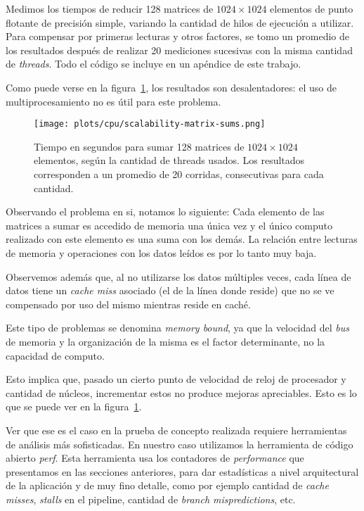 Medimos los tiempos de reducir 128 matrices de $1024 \times 1024$ elementos de punto
flotante de precisi\'on simple, variando la cantidad de hilos de ejecuci\'on a
utilizar. Para compensar por primeras lecturas y otros factores, se tomo un promedio
de los resultados despu\'es de realizar 20 mediciones sucesivas con la misma
cantidad de \textit{threads}. Todo el c\'odigo se incluye en un ap\'endice de este
trabajo.

Como puede verse en la figura~\ref{fig:sum-matrix-bench-result}, los resultados
son desalentadores: el uso de multiprocesamiento no es \'util para este problema.

\begin{figure}[htbp]
   \centering
   \texttt{[image: plots/cpu/scalability-matrix-sums.png]}
   \caption{Tiempo en segundos para sumar 128 matrices de $1024 \times 1024$
   elementos, seg\'un la cantidad de threads usados. Los resultados corresponden
   a un promedio de 20 corridas, consecutivas para cada cantidad.}
   \label{fig:sum-matrix-bench-result}
\end{figure}

Observando el problema en si, notamos lo siguiente: Cada elemento de las
matrices a sumar es accedido de memoria una \'unica vez y el \'unico computo
realizado con este elemento es una suma con los dem\'as. La relaci\'on entre
lecturas de memoria y operaciones con los datos le\'idos es por lo tanto muy baja.

Observemos adem\'as que, al no utilizarse los datos m\'ultiples veces, cada l\'inea
de datos tiene un \textit{cache miss} asociado (el de la l\'inea donde reside) que
no se ve compensado por uso del mismo mientras reside en cach\'e.

Este tipo de problemas se denomina \textit{memory bound}, ya que la velocidad del
\textit{bus} de memoria y la organizaci\'on de la misma es el factor determinante,
no la capacidad de computo.

Esto implica que, pasado un cierto punto de velocidad de reloj de procesador y
cantidad de n\'ucleos, incrementar estos no produce mejoras apreciables. Esto es
lo que se puede ver en la figura~\ref{fig:sum-matrix-bench-result}.

Ver que ese es el caso en la prueba de concepto realizada requiere herramientas
de an\'alisis m\'as sofisticadas. En nuestro caso utilizamos la herramienta de
c\'odigo abierto \textit{perf}. Esta herramienta usa los contadores de
\textit{performance} que presentamos en las secciones anteriores, para dar estad\'isticas
a nivel arquitectural de la aplicaci\'on y de muy fino detalle, como por
ejemplo cantidad de \textit{cache misses}, \textit{stalls} en el pipeline,
cantidad de \textit{branch mispredictions}, etc.

